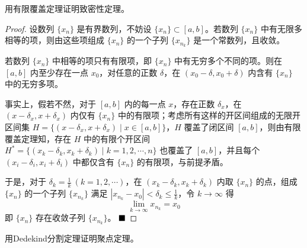 \begin{problem}
    用有限覆盖定理证明致密性定理。
\end{problem}

\begin{proof}
    设数列 $\{x_n\}$ 是有界数列，不妨设 $\{x_n\} \subset [a,b]$。若数列 $\{x_n\}$ 中有无限多相等的项，则由这些项组成 $\{x_n\}$ 的一个子列 $\{x_{n_k}\}$ 是一个常数列，且收敛。
    
    若数列 $\{x_n\}$ 中相等的项只有有限项，即 $\{x_n\}$ 中有无穷多个不同的项。则在 $[a,b]$ 内至少存在一点 $x_0$，对任意的正数 $\delta$，在 $(x_0 - \delta, x_0 + \delta)$ 内含有 $\{x_n\}$ 中的无穷多项。
    
    事实上，假若不然，对于 $[a,b]$ 内的每一点 $x$，存在正数 $\delta_x$，在 $(x - \delta_x, x + \delta_x)$ 内仅有 $\{x_n\}$ 中的有限项；考虑所有这样的开区间组成的无限开区间集 $H = \{(x - \delta_x, x + \delta_x) \mid x \in [a,b]\}$，$H$ 覆盖了闭区间 $[a,b]$，则由有限覆盖定理知，存在 $H$ 中的有限个开区间 $H^* = \{(x_k - \delta_k, x_k + \delta_k) \mid k = 1,2,\cdots,n\}$ 也覆盖了 $[a,b]$，并且每个 $(x_i - \delta_i, x_i + \delta_i)$ 中都仅含有 $\{x_n\}$ 的有限项，与前提矛盾。
    
    于是，对于 $\delta_k = \frac{1}{k} \ (k = 1,2,\cdots)$，在 $(x_k - \delta_k, x_k + \delta_k)$ 内取 $\{x_n\}$ 的点，组成 $\{x_n\}$ 的一个子列 $\{x_{n_k}\}$ 满足 $|x_{n_k} - x_0| < \delta_k \leq \frac{1}{k}$，令 $k \to \infty$ 得
    \[
    \lim\limits_{k \to \infty} x_{n_k} = x_0
    \]
    即 $\{x_n\}$ 存在收敛子列 $\{x_{n_k}\}$。 $\hfill \blacksquare$
\end{proof}

\begin{problem}
    用Dedekind分割定理证明聚点定理。
\end{problem}

